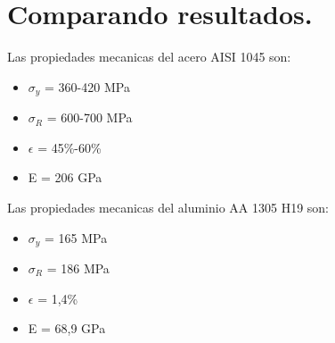 \documentclass[12pt,a4paper]{article}
\begin{document}
\section{Comparando resultados.}
Las propiedades mecanicas del acero AISI 1045 son:
\begin{itemize}
    \item $\sigma_y$  = 360-420 MPa
    \item $\sigma_R$ = 600-700 MPa
    \item $\epsilon$ = 45\%-60\%
    \item E = 206 GPa
\end{itemize}

Las propiedades mecanicas del aluminio AA 1305 H19 son:
\begin{itemize}
    \item $\sigma_y$  = 165 MPa
    \item $\sigma_R$ = 186 MPa
    \item $\epsilon$ = 1,4\%
    \item E = 68,9 GPa
\end{itemize}
\end{document}
